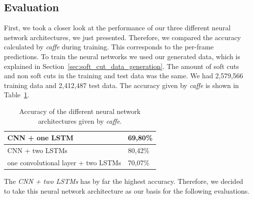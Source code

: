 \subsection{Evaluation}
\label{sec:soft_cut_evaluation}

First, we took a closer look at the performance of our three different neural network architectures, we just presented.
Therefore, we compared the accuracy calculated by \textit{caffe} during training.
This corresponds to the per-frame predictions.
To train the neural networks we used our generated data, which is explained in Section~\ref{sec:soft_cut_data_generation}.
The amount of soft cuts and non soft cuts in the training and test data was the same.
We had 2,579,566 training data and 2,412,487 test data.
The accuracy given by \textit{caffe} is shown in Table~\ref{tab:caffe_accuracy}.
\begin{table}[ht]
	\centering
	\begin{tabular}{l|l}
	CNN + one LSTM                      & 69,80\% \\ \hline
	CNN + two LSTMs                     & 80,42\% \\ \hline
	one convolutional layer + two LSTMs & 70,07\% \\
	\end{tabular}
	\caption{Accuracy of the different neural network architectures given by \textit{caffe}.}
	\label{tab:caffe_accuracy}
\end{table}
The \textit{CNN + two LSTMs} has by far the highest accuracy.
Therefore, we decided to take this neural network architecture as our basis for the following evaluations.

